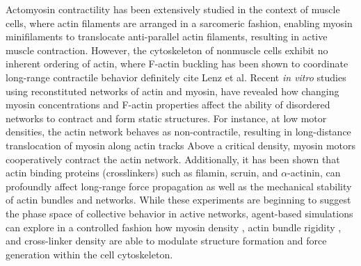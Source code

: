 \documentclass[11pt]{article}
\begin{document}
{\color{red}Actomyosin contractility has been extensively studied} in {\color{red}the context of} muscle cells, where actin filaments are arranged in {\color{red}a sarcomeric fashion}, enabling myosin {\color{red}minifilaments} to {\color{red}translocate} anti-parallel actin filaments, resulting {\color{red}in active} muscle contraction\cite{huxley1969}. However, the cytoskeleton of nonmuscle cells {\color{red}exhibit} no inherent ordering of actin, {\color{red}where F-actin buckling has been shown to coordinate long-range contractile behavior} {\color{blue}\cite{murrell2012, stam2015, murrell2015} definitely cite Lenz et al}.
Recent {\color{red}\it in vitro} studies \cite{murrell2012, murrell2014} {\color{red}using} reconstituted networks of actin and myosin, {\color{red}have revealed} how changing {\color{red}myosin} concentrations and {\color{red}F-actin properties} affect the ability of disordered {\color{red}networks} to contract and form static structures. For {\color{red}instance}, at low
motor densities, the {\color{red}actin network behaves as non-contractile, resulting} in {\color{red}long-distance translocation of} myosin along {\color{red}actin tracks}\cite{burov2013} Above a
critical density, myosin {\color{red}motors cooperatively} contract the {\color{red}actin} network\cite{murrell2014}. {\color{red}Additionally, it has been shown that} actin binding proteins (crosslinkers) such as filamin, scruin, and $\alpha$-actinin, {\color{red}can profoundly affect} long-range force propagation as well as {\color{red}the mechanical stability of actin} bundles and networks\cite{gardel2004, murrell2012, murrell2014, murrell2015}. {\color{red}While} these experiments {\color{red}are beginning to suggest} the phase {\color{red}space of collective behavior in} active networks, {\color{red}agent-based simulations can explore in a controlled fashion how} myosin density \cite{murrell2012}, actin bundle rigidity \cite{murrell2012}, and cross-linker density\cite{murrell2014} {\color{red}are able to modulate} structure formation and force generation within the {\color{red}cell} cytoskeleton.  
\end{document}
